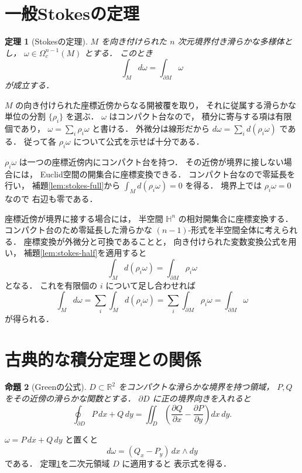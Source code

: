\documentclass[a5paper,10pt,onecolumn]{jsarticle}
\makeatletter
\theoremstyle{mathnotetheorem}
\newtheorem{theorem}{定理}[section]
\newtheorem{proposition}[theorem]{命題}
\renewcommand{\proofname}{証明}
\renewenvironment{proof}[1][\proofname]{%
  \par\pushQED{\qed}\normalfont\topsep4\p@\@plus2\p@\relax
  \trivlist\item[\hskip\labelsep\bfseries #1]\ignorespaces
}{\popQED\endtrivlist\@endpefalse}
\makeatother
\begin{document}
\section{一般Stokesの定理}

\begin{theorem}[Stokesの定理]\label{thm:stokes}
$M$ を向き付けられた $n$ 次元境界付き滑らかな多様体とし，
$\omega\in\Omega_c^{n-1}(M)$ とする．
このとき
\[
 \boxed{\displaystyle
 \int_Md\omega=\int_{\partial M}\omega}
\]
が成立する．
\end{theorem}
\begin{proof}
$M$ の向き付けられた座標近傍からなる開被覆を取り，
それに従属する滑らかな単位の分割
$\{\rho_i\}$ を選ぶ．
$\omega$ はコンパクト台なので，
積分に寄与する項は有限個であり，
$\omega=\sum_i\rho_i\omega$ と書ける．
外微分は線形だから
$d\omega=\sum_i d(\rho_i\omega)$ である．
従って各 $\rho_i\omega$ について公式を示せば十分である．

$\rho_i\omega$ は一つの座標近傍内にコンパクト台を持つ．
その近傍が境界に接しない場合には，
Euclid空間の開集合に座標変換できる．
コンパクト台なので零延長を行い，
補題\ref{lem:stokes-full}から
$\int_Md(\rho_i\omega)=0$ を得る．
境界上では $\rho_i\omega=0$ なので
右辺も零である．

座標近傍が境界に接する場合には，
半空間 $\mathbb H^n$ の相対開集合に座標変換する．
コンパクト台のため零延長した滑らかな
$(n-1)$-形式を半空間全体に考えられる．
座標変換が外微分と可換であることと，
向き付けられた変数変換公式を用い，
補題\ref{lem:stokes-half}を適用すると
\[
 \int_Md(\rho_i\omega)
 =\int_{\partial M}\rho_i\omega
\]
となる．
これを有限個の $i$ について足し合わせれば
\[
 \int_Md\omega
 =\sum_i\int_Md(\rho_i\omega)
 =\sum_i\int_{\partial M}\rho_i\omega
 =\int_{\partial M}\omega
\]
が得られる．
\end{proof}

\section{古典的な積分定理との関係}

\begin{proposition}[Greenの公式]\label{prop:green}
$D\subset\mathbb R^2$ をコンパクトな滑らかな境界を持つ領域，
$P,Q$ をその近傍の滑らかな関数とする．
$\partial D$ に正の境界向きを入れると
\[
 \oint_{\partial D}P\,dx+Q\,dy
 =\iint_D\left(\frac{\partial Q}{\partial x}
               -\frac{\partial P}{\partial y}\right)dx\,dy.
\]
\end{proposition}
\begin{proof}
$\omega=P\,dx+Q\,dy$ と置くと
\[
 d\omega=(Q_x-P_y)\,dx\wedge dy
\]
である．
定理\ref{thm:stokes}を二次元領域 $D$ に適用すると
表示式を得る．
\end{proof}
\end{document}
